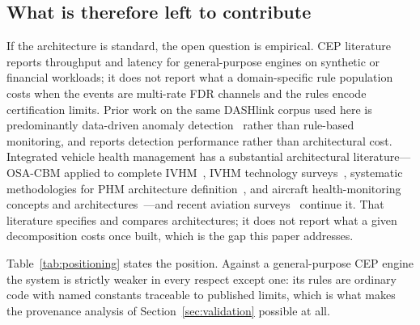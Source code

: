 \documentclass[conference]{IEEEtran}
\begin{document}
\subsection{What is therefore left to contribute}

If the architecture is standard, the open question is empirical. CEP
literature reports throughput and latency for general-purpose engines on
synthetic or financial workloads; it does not report what a domain-specific
rule population costs when the events are multi-rate FDR channels and the
rules encode certification limits. Prior work on the same DASHlink corpus used
here is predominantly data-driven anomaly detection~\cite{matthews2013} rather
than rule-based monitoring, and reports detection performance rather than
architectural cost. Integrated vehicle health management has a substantial architectural
literature---OSA-CBM applied to complete IVHM~\cite{dunsdon2008}, IVHM
technology surveys~\cite{bahon2007}, systematic methodologies for PHM
architecture definition~\cite{li2022}, and aircraft health-monitoring
concepts and architectures~\cite{denecke2011}---and recent aviation
surveys~\cite{bisanti2023,kabashkin2024} continue it. That literature
specifies and compares architectures; it does not report what a given
decomposition costs once built, which is the gap this paper addresses.

Table~\ref{tab:positioning} states the position. Against a general-purpose CEP
engine the system is strictly weaker in every respect except one: its rules
are ordinary code with named constants traceable to published limits, which is
what makes the provenance analysis of Section~\ref{sec:validation} possible at
all.
\end{document}
